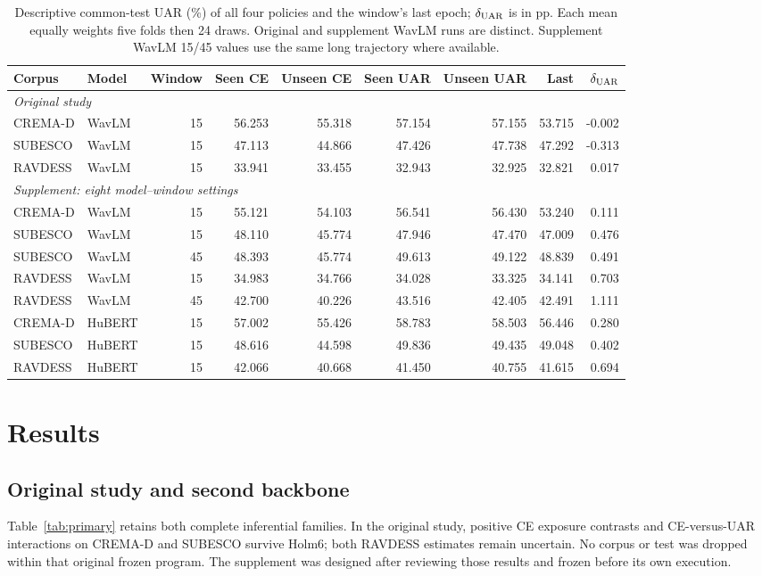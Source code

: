 \documentclass[letterpaper]{article}
\begin{document}
\begin{table}[t]
\centering\small
\caption{Descriptive common-test UAR (\%) of all four policies and the window's last epoch; $\delta_{\rm UAR}$ is in pp. Each mean equally weights five folds then 24 draws. Original and supplement WavLM runs are distinct. Supplement WavLM 15/45 values use the same long trajectory where available.}
\label{tab:absolute}
\setlength{\tabcolsep}{3.5pt}
\begin{tabular}{llrrrrrrr}\toprule
Corpus & Model & Window & Seen CE & Unseen CE & Seen UAR & Unseen UAR & Last & $\delta_{\rm UAR}$\\\midrule
\multicolumn{9}{l}{\textit{Original study}}\\
CREMA-D & WavLM & 15 & 56.253 & 55.318 & 57.154 & 57.155 & 53.715 & -0.002\\
SUBESCO & WavLM & 15 & 47.113 & 44.866 & 47.426 & 47.738 & 47.292 & -0.313\\
RAVDESS & WavLM & 15 & 33.941 & 33.455 & 32.943 & 32.925 & 32.821 & 0.017\\\midrule
\multicolumn{9}{l}{\textit{Supplement: eight model--window settings}}\\
CREMA-D & WavLM & 15 & 55.121 & 54.103 & 56.541 & 56.430 & 53.240 & 0.111\\
SUBESCO & WavLM & 15 & 48.110 & 45.774 & 47.946 & 47.470 & 47.009 & 0.476\\
SUBESCO & WavLM & 45 & 48.393 & 45.774 & 49.613 & 49.122 & 48.839 & 0.491\\
RAVDESS & WavLM & 15 & 34.983 & 34.766 & 34.028 & 33.325 & 34.141 & 0.703\\
RAVDESS & WavLM & 45 & 42.700 & 40.226 & 43.516 & 42.405 & 42.491 & 1.111\\
CREMA-D & HuBERT & 15 & 57.002 & 55.426 & 58.783 & 58.503 & 56.446 & 0.280\\
SUBESCO & HuBERT & 15 & 48.616 & 44.598 & 49.836 & 49.435 & 49.048 & 0.402\\
RAVDESS & HuBERT & 15 & 42.066 & 40.668 & 41.450 & 40.755 & 41.615 & 0.694\\
\bottomrule
\end{tabular}
\end{table}

\section{Results}
\subsection{Original study and second backbone}
Table~\ref{tab:primary} retains both complete inferential families. In the original study, positive CE exposure contrasts and CE-versus-UAR interactions on CREMA-D and SUBESCO survive Holm6; both RAVDESS estimates remain uncertain. No corpus or test was dropped within that original frozen program. The supplement was designed after reviewing those results and frozen before its own execution.
\end{document}
